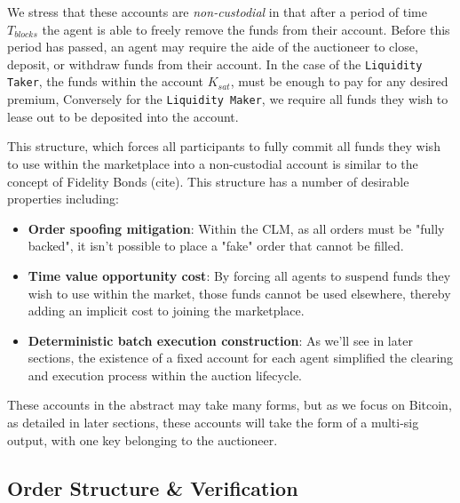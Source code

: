 \documentclass[12pt,a4paper]{article}
\theoremstyle{definition}
\begin{document}
We stress that these accounts are \emph{non-custodial} in that after a period
of time $T_{blocks}$ the agent is able to freely remove the funds from their
account. Before this period has passed, an agent may require the aide of the
auctioneer to close, deposit, or withdraw funds from their account. In the case
of the \texttt{Liquidity Taker}, the funds within the account $K_{sat}$, must
be enough to pay for any desired premium, Conversely for the \texttt{Liquidity
Maker}, we require all funds they wish to lease out to be deposited into the
account.

This structure, which forces all participants to fully commit all funds they
wish to use within the marketplace into a non-custodial account is similar to
the concept of Fidelity Bonds (cite). This structure has a number of desirable
properties including:

\begin{itemize} %
    \item \textbf{Order spoofing mitigation}: Within the CLM, as all orders
        must be "fully backed", it isn't possible to place a "fake" order that
        cannot be filled.

    \item \textbf{Time value opportunity cost}: By forcing all agents to
        suspend funds they wish to use within the market, those funds cannot be
        used elsewhere, thereby adding an implicit cost to joining the
        marketplace.

    \item \textbf{Deterministic batch execution construction}: As we'll see in
        later sections, the existence of a fixed account for each agent
        simplified the clearing and execution process within the auction
        lifecycle.

\end{itemize}

These accounts in the abstract may take many forms, but as we focus on Bitcoin,
as detailed in later sections, these accounts will take the form of a multi-sig
output, with one key belonging to the auctioneer.


\subsection{Order Structure \& Verification}
\end{document}
